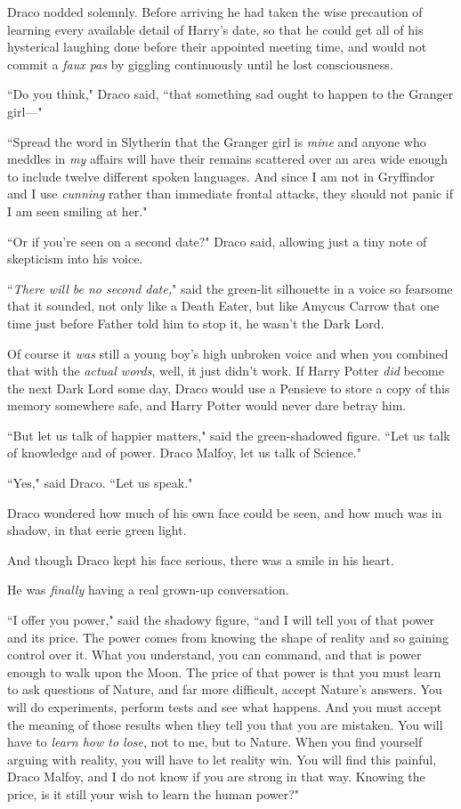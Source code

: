 Draco nodded solemnly. Before arriving he had taken the wise precaution of learning every available detail of Harry's date, so that he could get all of his hysterical laughing done before their appointed meeting time, and would not commit a \emph{faux pas} by giggling continuously until he lost consciousness.

``Do you think," Draco said, ``that something sad ought to happen to the Granger girl—"

``Spread the word in Slytherin that the Granger girl is \emph{mine} and anyone who meddles in \emph{my} affairs will have their remains scattered over an area wide enough to include twelve different spoken languages. And since I am not in Gryffindor and I use \emph{cunning} rather than immediate frontal attacks, they should not panic if I am seen smiling at her."

``Or if you're seen on a second date?" Draco said, allowing just a tiny note of skepticism into his voice.

``\emph{There will be no second date,}" said the green-lit silhouette in a voice so fearsome that it sounded, not only like a Death Eater, but like Amycus Carrow that one time just before Father told him to stop it, he wasn't the Dark Lord.

Of course it \emph{was} still a young boy's high unbroken voice and when you combined that with the \emph{actual words}, well, it just didn't work. If Harry Potter \emph{did} become the next Dark Lord some day, Draco would use a Pensieve to store a copy of this memory somewhere safe, and Harry Potter would never dare betray him.

``But let us talk of happier matters," said the green-shadowed figure. ``Let us talk of knowledge and of power. Draco Malfoy, let us talk of Science."

``Yes," said Draco. ``Let us speak."

Draco wondered how much of his own face could be seen, and how much was in shadow, in that eerie green light.

And though Draco kept his face serious, there was a smile in his heart.

He was \emph{finally} having a real grown-up conversation.

``I offer you power," said the shadowy figure, ``and I will tell you of that power and its price. The power comes from knowing the shape of reality and so gaining control over it. What you understand, you can command, and that is power enough to walk upon the Moon. The price of that power is that you must learn to ask questions of Nature, and far more difficult, accept Nature's answers. You will do experiments, perform tests and see what happens. And you must accept the meaning of those results when they tell you that you are mistaken. You will have to \emph{learn how to lose}, not to me, but to Nature. When you find yourself arguing with reality, you will have to let reality win. You will find this painful, Draco Malfoy, and I do not know if you are strong in that way. Knowing the price, is it still your wish to learn the human power?"

